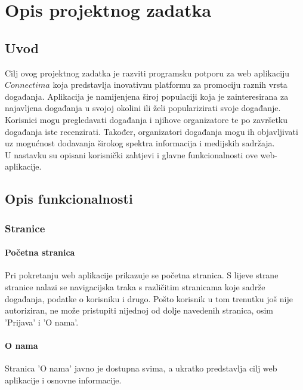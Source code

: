 \chapter{Opis projektnog zadatka}
				
		\section{Uvod}
		
		Cilj ovog projektnog zadatka je razviti programsku potporu za web aplikaciju $\textit{Connectima}$ koja predstavlja inovativnu platformu za promociju raznih vrsta događanja. Aplikacija je namijenjena široj populaciji koja je zainteresirana za najavljena događanja u svojoj okolini ili želi popularizirati svoje događanje. \\ Korisnici mogu pregledavati događanja i njihove organizatore te po završetku događanja iste recenzirati. Također, organizatori događanja mogu ih objavljivati uz mogućnost dodavanja širokog spektra informacija i medijskih sadržaja.\\
		U nastavku su opisani korisnički zahtjevi i glavne funkcionalnosti ove web-aplikacije.
		
		\section{Opis funkcionalnosti}
		
			\subsection{Stranice}
			
				\subsubsection{Početna stranica}
				Pri pokretanju web aplikacije prikazuje se početna stranica. S lijeve strane stranice nalazi se navigacijska traka s različitim stranicama koje sadrže događanja, podatke o korisniku i drugo. Pošto korisnik u tom trenutku još nije autoriziran, ne može pristupiti nijednoj od dolje navedenih stranica, osim 'Prijava' i 'O nama'.
				
				\subsubsection{O nama}
				Stranica 'O nama' javno je dostupna svima, a ukratko predstavlja cilj web aplikacije i osnovne informacije.
				
